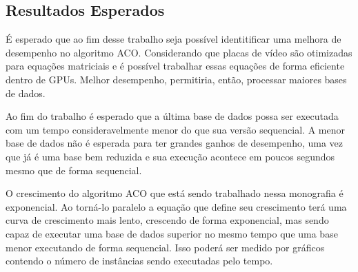 \subsection{Resultados Esperados} \label{resultadosEsperados}

É esperado que ao fim desse trabalho seja possível identitificar uma melhora de desempenho
no algoritmo ACO. Considerando que placas de vídeo são otimizadas para equações matriciais e
é possível trabalhar essas equações de forma eficiente dentro de GPUs. Melhor desempenho,
permitiria, então, processar maiores bases de dados. 

Ao fim do trabalho é esperado que a última base de dados possa ser executada com um tempo 
consideravelmente menor do que sua versão sequencial. A menor base de dados não é esperada
para ter grandes ganhos de desempenho, uma vez que já é uma base bem reduzida e sua execução
acontece em poucos segundos mesmo que de forma sequencial.

O crescimento do algoritmo ACO que está sendo trabalhado nessa monografia é exponencial. 
Ao torná-lo paralelo a equação que define seu crescimento terá uma curva de crescimento mais lento,
crescendo de forma exponencial, mas sendo capaz de executar uma base de dados superior no mesmo tempo 
que uma base menor executando de forma sequencial. Isso poderá ser medido por gráficos contendo
o número de instâncias sendo executadas pelo tempo.